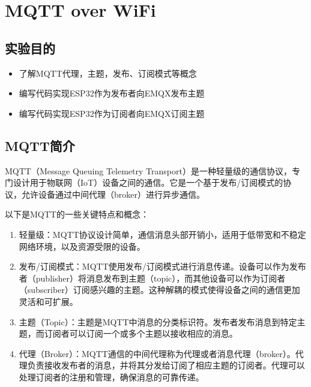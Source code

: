 \documentclass[a4paper,12pt,english]{sphinxmanual}
\begin{document}
{{\sphinxstepscope


\section{MQTT over WiFi}
\label{\detokenize{exp-esp32/mqtt:mqtt-over-wifi}}\label{\detokenize{exp-esp32/mqtt::doc}}

\subsection{实验目的}
\label{\detokenize{exp-esp32/mqtt:id1}}\begin{itemize}
\item {} 
\sphinxAtStartPar
了解MQTT代理，主题，发布、订阅模式等概念

\item {} 
\sphinxAtStartPar
编写代码实现ESP32作为发布者向EMQX发布主题

\item {} 
\sphinxAtStartPar
编写代码实现ESP32作为订阅者向EMQX订阅主题

\end{itemize}


\subsection{MQTT简介}
\label{\detokenize{exp-esp32/mqtt:mqtt}}
\sphinxAtStartPar
MQTT（Message Queuing Telemetry Transport）是一种轻量级的通信协议，专门设计用于物联网（IoT）设备之间的通信。它是一个基于发布/订阅模式的协议，允许设备通过中间代理（broker）进行异步通信。

\sphinxAtStartPar
以下是MQTT的一些关键特点和概念：
\begin{enumerate}
%
\item {} 
\sphinxAtStartPar
轻量级：MQTT协议设计简单，通信消息头部开销小，适用于低带宽和不稳定网络环境，以及资源受限的设备。

\item {} 
\sphinxAtStartPar
发布/订阅模式：MQTT使用发布/订阅模式进行消息传递。设备可以作为发布者（publisher）将消息发布到主题（topic），而其他设备可以作为订阅者（subscriber）订阅感兴趣的主题。这种解耦的模式使得设备之间的通信更加灵活和可扩展。

\item {} 
\sphinxAtStartPar
主题（Topic）：主题是MQTT中消息的分类标识符。发布者发布消息到特定主题，而订阅者可以订阅一个或多个主题以接收相应的消息。

\item {} 
\sphinxAtStartPar
代理（Broker）：MQTT通信的中间代理称为代理或者消息代理（broker）。代理负责接收发布者的消息，并将其分发给订阅了相应主题的订阅者。代理可以处理订阅者的注册和管理，确保消息的可靠传递。


\end{enumerate}}}
\end{document}
